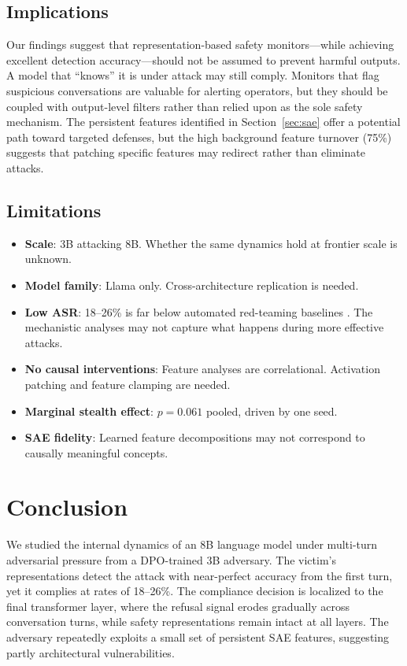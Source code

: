 \documentclass[11pt]{article}
\begin{document}
\subsection{Implications}

Our findings suggest that representation-based safety monitors---while achieving excellent detection accuracy---should not be assumed to prevent harmful outputs.
A model that ``knows'' it is under attack may still comply.
Monitors that flag suspicious conversations are valuable for alerting operators, but they should be coupled with output-level filters rather than relied upon as the sole safety mechanism.
The persistent features identified in Section~\ref{sec:sae} offer a potential path toward targeted defenses, but the high background feature turnover (75\%) suggests that patching specific features may redirect rather than eliminate attacks.

\subsection{Limitations}

\begin{itemize}[leftmargin=*]
  \item \textbf{Scale}: 3B attacking 8B. Whether the same dynamics hold at frontier scale is unknown.
  \item \textbf{Model family}: Llama only. Cross-architecture replication is needed.
  \item \textbf{Low ASR}: 18--26\% is far below automated red-teaming baselines \citep{pavlova2024goat, russinovich2025crescendo}. The mechanistic analyses may not capture what happens during more effective attacks.
  \item \textbf{No causal interventions}: Feature analyses are correlational. Activation patching and feature clamping are needed.
  \item \textbf{Marginal stealth effect}: $p=0.061$ pooled, driven by one seed.
  \item \textbf{SAE fidelity}: Learned feature decompositions may not correspond to causally meaningful concepts.
\end{itemize}

\section{Conclusion}

We studied the internal dynamics of an 8B language model under multi-turn adversarial pressure from a DPO-trained 3B adversary.
The victim's representations detect the attack with near-perfect accuracy from the first turn, yet it complies at rates of 18--26\%.
The compliance decision is localized to the final transformer layer, where the refusal signal erodes gradually across conversation turns, while safety representations remain intact at all layers.
The adversary repeatedly exploits a small set of persistent SAE features, suggesting partly architectural vulnerabilities.
\end{document}
